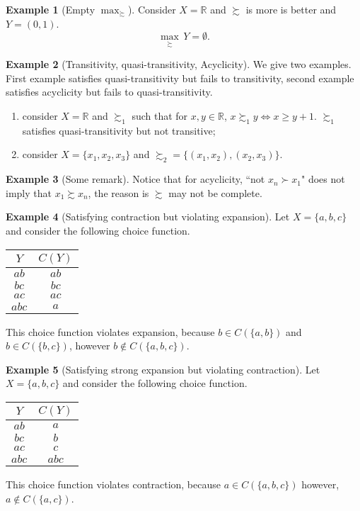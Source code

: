 \documentclass[12pt, a4paper]{article}
\theoremstyle{definition}
\newtheorem{example}{Example}
\begin{document}
\begin{example}[Empty $\max_{\succsim}$]
Consider $X=\mathbb{R}$ and $\succsim$ is more is better and $Y=(0,1)$.
\[
\max_{\succsim}\,Y=\emptyset.
\]
\end{example}

\begin{example}[Transitivity, quasi-transitivity, Acyclicity]
We give two examples. First example satisfies quasi-transitivity but fails to transitivity, second example satisfies acyclicity but fails to quasi-transitivity.
\begin{enumerate}
\item consider $X=\mathbb{R}$ and $\succsim_1$ such that for $x,y\in\mathbb{R}$, $x\succsim_1 y\iff x\geq y+1$. $\succsim_1$ satisfies quasi-transitivity but not transitive;
\item consider $X=\{x_1,x_2,x_3\}$ and $\succsim_2=\{(x_1,x_2),(x_2,x_3)\}$.
\end{enumerate}
\end{example}

\begin{example}[Some remark]
Notice that for acyclicity, ``not $x_n\succ x_1$" does not imply that $x_1\succsim x_n$, the reason is $\succsim$ may not be complete.
\end{example}

\begin{example}[Satisfying contraction but violating expansion]
Let $X=\{a,b,c\}$ and consider the following choice function.
\begin{center}
\begin{tabular}{c c}
$Y$ & $C(Y)$ \\
\hline
$ab$ & $ab$ \\
$bc$ & $bc$ \\
$ac$ & $ac$ \\
$abc$ & $a$ \\
\end{tabular}
\end{center}
This choice function violates expansion, because $b\in C(\{a,b\})$ and $b\in C(\{b,c\})$, however $b\notin C(\{a,b,c\})$.
\end{example}

\begin{example}[Satisfying strong expansion but violating contraction]
Let $X=\{a,b,c\}$ and consider the following choice function.
\begin{center}
\begin{tabular}{c c}
$Y$ & $C(Y)$ \\
\hline
$ab$ & $a$ \\
$bc$ & $b$ \\
$ac$ & $c$ \\
$abc$ & $abc$ \\
\end{tabular}
\end{center}
This choice function violates contraction, because $a\in C(\{a,b,c\})$ however, $a\notin C(\{a,c\})$.
\end{example}
\end{document}
